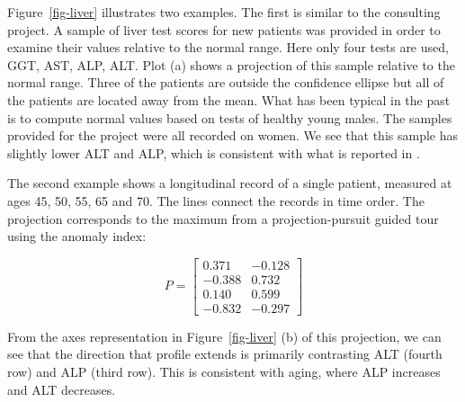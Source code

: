 \documentclass[
  12pt]{article}
\begin{document}
Figure~\ref{fig-liver} illustrates two examples. The first is similar to
the consulting project. A sample of liver test scores for new patients
was provided in order to examine their values relative to the normal
range. Here only four tests are used, GGT, AST, ALP, ALT. Plot (a) shows
a projection of this sample relative to the normal range. Three of the
patients are outside the confidence ellipse but all of the patients are
located away from the mean. What has been typical in the past is to
compute normal values based on tests of healthy young males. The samples
provided for the project were all recorded on women. We see that this
sample has slightly lower ALT and ALP, which is consistent with what is
reported in \citet{lib-med-liver-norms}.

The second example shows a longitudinal record of a single patient,
measured at ages 45, 50, 55, 65 and 70. The lines connect the records in
time order. The projection corresponds to the maximum from a
projection-pursuit guided tour using the anomaly index:

\[
P = \left[ \begin{array}{rr}
            0.371 & -0.128 \\
            -0.388 & 0.732 \\
            0.140 & 0.599 \\
            -0.832 & -0.297 
            \end{array} \right]
\]

From the axes representation in Figure~\ref{fig-liver} (b) of this
projection, we can see that the direction that profile extends is
primarily contrasting ALT (fourth row) and ALP (third row). This is
consistent with aging, where ALP increases and ALT decreases.
\end{document}
